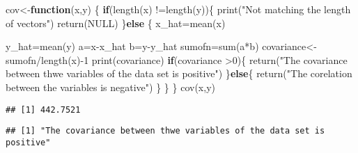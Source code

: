 \documentclass[
]{article}
\newenvironment{Shaded}{\begin{snugshade}}{\end{snugshade}}
\newcommand{\ConstantTok}[1]{\textcolor[rgb]{0.00,0.00,0.00}{#1}}
\newcommand{\ControlFlowTok}[1]{\textcolor[rgb]{0.13,0.29,0.53}{\textbf{#1}}}
\newcommand{\DecValTok}[1]{\textcolor[rgb]{0.00,0.00,0.81}{#1}}
\newcommand{\FunctionTok}[1]{\textcolor[rgb]{0.00,0.00,0.00}{#1}}
\newcommand{\NormalTok}[1]{#1}
\newcommand{\OtherTok}[1]{\textcolor[rgb]{0.56,0.35,0.01}{#1}}
\newcommand{\SpecialCharTok}[1]{\textcolor[rgb]{0.00,0.00,0.00}{#1}}
\newcommand{\StringTok}[1]{\textcolor[rgb]{0.31,0.60,0.02}{#1}}
\begin{document}
\begin{Shaded}
\begin{Highlighting}[]
\NormalTok{cov}\OtherTok{\textless{}{-}}\ControlFlowTok{function}\NormalTok{(x,y) \{}
  \ControlFlowTok{if}\NormalTok{(}\FunctionTok{length}\NormalTok{(x) }\SpecialCharTok{!=}\FunctionTok{length}\NormalTok{(y))\{}
    \FunctionTok{print}\NormalTok{(}\StringTok{"Not matching the length of vectors"}\NormalTok{)}
    \FunctionTok{return}\NormalTok{(}\ConstantTok{NULL}\NormalTok{)}
\NormalTok{  \}}\ControlFlowTok{else}\NormalTok{ \{}
\NormalTok{    x\_hat}\OtherTok{=}\FunctionTok{mean}\NormalTok{(x)}
    
\NormalTok{    y\_hat}\OtherTok{=}\FunctionTok{mean}\NormalTok{(y)}
\NormalTok{    a}\OtherTok{=}\NormalTok{x}\SpecialCharTok{{-}}\NormalTok{x\_hat}
\NormalTok{    b}\OtherTok{=}\NormalTok{y}\SpecialCharTok{{-}}\NormalTok{y\_hat}
\NormalTok{    sumofn}\OtherTok{=}\FunctionTok{sum}\NormalTok{(a}\SpecialCharTok{*}\NormalTok{b)}
\NormalTok{    covariance}\OtherTok{\textless{}{-}}\NormalTok{sumofn}\SpecialCharTok{/}\FunctionTok{length}\NormalTok{(x)}\SpecialCharTok{{-}}\DecValTok{1}
    \FunctionTok{print}\NormalTok{(covariance)}
    \ControlFlowTok{if}\NormalTok{(covariance }\SpecialCharTok{\textgreater{}}\DecValTok{0}\NormalTok{)\{}
      \FunctionTok{return}\NormalTok{(}\StringTok{"The covariance between thwe variables of the data set is positive"}\NormalTok{)}
\NormalTok{    \}}\ControlFlowTok{else}\NormalTok{\{}
      \FunctionTok{return}\NormalTok{(}\StringTok{"The corelation between the variables is negative"}\NormalTok{)}
\NormalTok{    \}}
\NormalTok{  \}}
\NormalTok{\}}
\FunctionTok{cov}\NormalTok{(x,y)}
\end{Highlighting}
\end{Shaded}

\begin{verbatim}
## [1] 442.7521
\end{verbatim}

\begin{verbatim}
## [1] "The covariance between thwe variables of the data set is positive"
\end{verbatim}
\end{document}

